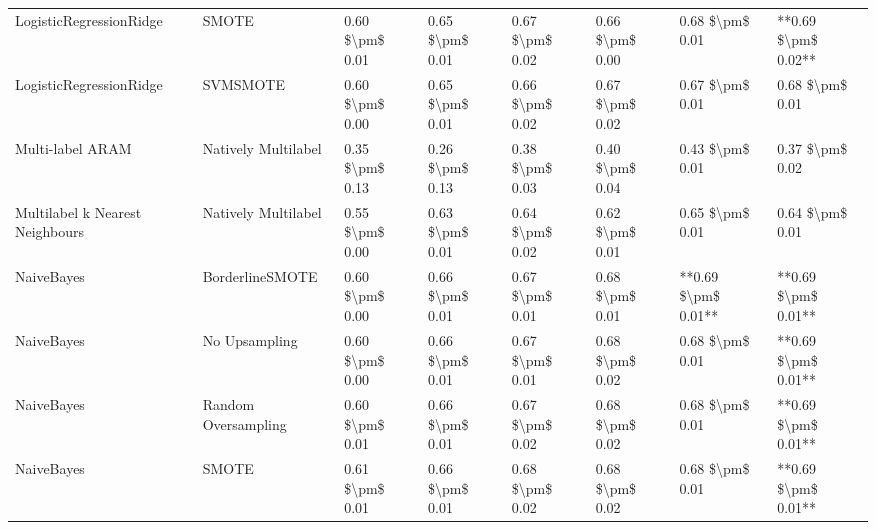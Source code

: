 \begin{tabular}{llllllll}
        LogisticRegressionRidge &                         SMOTE & 0.60 \$\textbackslash pm\$ 0.01 &           0.65 \$\textbackslash pm\$ 0.01 &       0.67 \$\textbackslash pm\$ 0.02 &        0.66 \$\textbackslash pm\$ 0.00 &                         0.68 \$\textbackslash pm\$ 0.01 & **0.69 \$\textbackslash pm\$ 0.02** \\
        LogisticRegressionRidge &                      SVMSMOTE & 0.60 \$\textbackslash pm\$ 0.00 &           0.65 \$\textbackslash pm\$ 0.01 &       0.66 \$\textbackslash pm\$ 0.02 &        0.67 \$\textbackslash pm\$ 0.02 &                         0.67 \$\textbackslash pm\$ 0.01 &     0.68 \$\textbackslash pm\$ 0.01 \\
               Multi-label ARAM &           Natively Multilabel & 0.35 \$\textbackslash pm\$ 0.13 &           0.26 \$\textbackslash pm\$ 0.13 &       0.38 \$\textbackslash pm\$ 0.03 &        0.40 \$\textbackslash pm\$ 0.04 &                         0.43 \$\textbackslash pm\$ 0.01 &     0.37 \$\textbackslash pm\$ 0.02 \\
Multilabel k Nearest Neighbours &           Natively Multilabel & 0.55 \$\textbackslash pm\$ 0.00 &           0.63 \$\textbackslash pm\$ 0.01 &       0.64 \$\textbackslash pm\$ 0.02 &        0.62 \$\textbackslash pm\$ 0.01 &                         0.65 \$\textbackslash pm\$ 0.01 &     0.64 \$\textbackslash pm\$ 0.01 \\
                     NaiveBayes &               BorderlineSMOTE & 0.60 \$\textbackslash pm\$ 0.00 &           0.66 \$\textbackslash pm\$ 0.01 &       0.67 \$\textbackslash pm\$ 0.01 &        0.68 \$\textbackslash pm\$ 0.01 &                     **0.69 \$\textbackslash pm\$ 0.01** & **0.69 \$\textbackslash pm\$ 0.01** \\
                     NaiveBayes &                 No Upsampling & 0.60 \$\textbackslash pm\$ 0.00 &           0.66 \$\textbackslash pm\$ 0.01 &       0.67 \$\textbackslash pm\$ 0.01 &        0.68 \$\textbackslash pm\$ 0.02 &                         0.68 \$\textbackslash pm\$ 0.01 & **0.69 \$\textbackslash pm\$ 0.01** \\
                     NaiveBayes &           Random Oversampling & 0.60 \$\textbackslash pm\$ 0.01 &           0.66 \$\textbackslash pm\$ 0.01 &       0.67 \$\textbackslash pm\$ 0.02 &        0.68 \$\textbackslash pm\$ 0.02 &                         0.68 \$\textbackslash pm\$ 0.01 & **0.69 \$\textbackslash pm\$ 0.01** \\
                     NaiveBayes &                         SMOTE & 0.61 \$\textbackslash pm\$ 0.01 &           0.66 \$\textbackslash pm\$ 0.01 &       0.68 \$\textbackslash pm\$ 0.02 &        0.68 \$\textbackslash pm\$ 0.02 &                         0.68 \$\textbackslash pm\$ 0.01 & **0.69 \$\textbackslash pm\$ 0.01** \\

\end{tabular}
